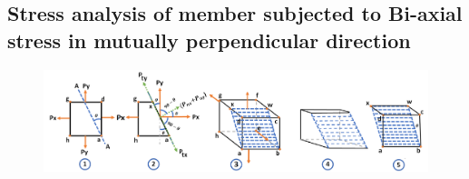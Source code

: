\documentclass[8pt]{report}
\begin{document}
	\subsection{Stress analysis of member subjected to Bi-axial stress in mutually perpendicular direction}
		\begin{figure}[H]
				\hspace{-0.7cm}
				\includegraphics[scale=0.45]{case2a.png}
		\end{figure}
\end{document}
